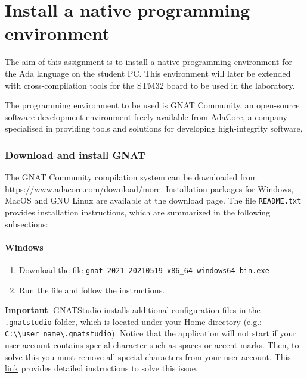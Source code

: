 \chapter{Install a native programming environment}\label{ch:Assignment1}

The aim of this assignment is to install a native programming environment for the Ada language on the student PC. This environment will later be extended with cross-compilation tools for the STM32 board to be used in the laboratory. 

The programming environment to be used is GNAT Community, an open-source software development environment freely available from AdaCore, a company specialised in providing tools and solutions for developing high-integrity software,

\subsection{Download and install GNAT}
The GNAT Community compilation system can be downloaded from \url{https://www.adacore.com/download/more}.
Installation packages for Windows, MacOS and GNU Linux
are available at the download page.
The file \texttt{README.txt} provides installation instructions,
which are summarized in the following subsections:

\subsubsection*{Windows}
\begin{enumerate}
	\item Download the file \href{https://community.download.adacore.com/v1/797dbae8bdb8a3f661dad78dd73d8e40218a68d8?filename=gnat-2021-20210519-x86\_64-windows64-bin.exe\&rand=1472}{\texttt{gnat-2021-20210519-x86\_64-windows64-bin.exe}}
	
	\item Run the file and follow the instructions.
\end{enumerate}

\textbf{\textcolor{mRedBrown}{Important}}:
GNATStudio installs additional configuration files in the \texttt{.gnatstudio} folder,
which is located under your Home directory (e.g.: \texttt{C:\textbackslash{}\textbackslash{}user\_name\textbackslash{}.gnatstudio}).
Notice that the application will not start if your user account contains special character such as spaces or accent marks.
Then, to solve this you must remove all special characters from your user account.
This 
\href{https://superuser.com/questions/890812/how-to-rename-the-user-folder-in-windows-10/1346983#1346983}
{link}
provides detailed instructions to solve this issue.

